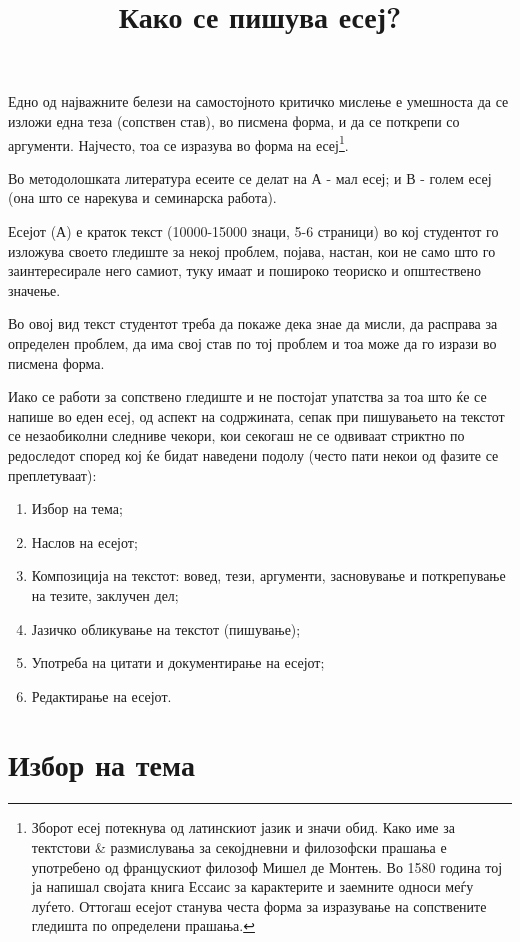 \documentclass[12pt,a4paper]{article}
\title{Како се пишува есеј?}
\begin{document}
\maketitle


Едно од најважните белези на самостојното критичко мисле­ње е умешноста да се
изложи една теза (сопствен став), во писмена форма, и да се поткрепи со
аргументи. Најчесто, тоа се изразува во форма на есеј\footnote{Зборот есеј
потекнува од латинскиот јазик и значи обид. Како име за тектстови & размислувања
за секојдневни и филозофски прашања е употребено од францускиот филозоф Мишел де
Монтењ. Во 1580 година тој ја напишал својата книга Ессаис за карактерите и
заемните односи меѓу луѓето. Оттогаш есејот станува честа форма за изразување на
сопствените гледишта по определени прашања.}.

Во методолошката литература есеите се делат на А - мал есеј; и В - голем есеј
(она што се нарекува и семинарска работа).

Есејот (А) е краток текст (10000-15000 знаци, 5-6 страници) во кој студентот го
изложува своето гледиште за некој проблем, појава, настан, кои не само што го
заинтересира­ле него самиот, туку имаат и пошироко теориско и општест­вено
значење.

Во овој вид текст студентот треба да покаже дека знае да мисли, да расправа за
определен проблем, да има свој став по тој проблем и тоа може да го изрази во
писмена форма.

Иако се работи за сопствено гледиште и не постојат упатст­ва за тоа што ќе се
напише во еден есеј, од аспект на со­држината, сепак при пишувањето на текстот
се незаобикол­ни следниве чекори, кои секогаш не се одвиваат стриктно по
редоследот според кој ќе бидат наведени подолу (често пати некои од фазите се
преплетуваат):

\begin{enumerate}
  \item Избор на тема; 
  \item Наслов на есејот; 
  \item Композиција на текстот: вовед, тези, аргументи, заснову­вање и
  поткрепување на тезите, заклучен дел;
  \item Јазичко обликување на текстот (пишување);
  \item Употреба на цитати и документирање на есејот;
  \item Редактирање на есејот.
\end{enumerate}
 

\section{Избор на тема} 
\end{document}
